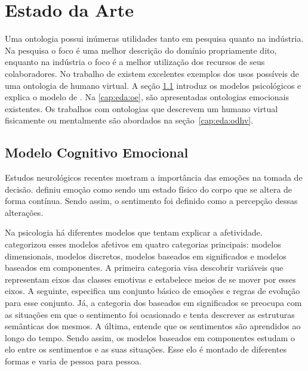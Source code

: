 \chapter{Estado da Arte} \label{cap:eda}

Uma ontologia possui inúmeras utilidades tanto em pesquisa quanto na
indústria. Na pesquisa o foco é uma melhor descrição do domínio propriamente
dito, enquanto na indústria o foco é a melhor utilização dos recursos de seus
colaboradores. No trabalho de \citet{Gutierrez:2007:OVH:1229160.1229164} existem
excelentes exemplos dos usos possíveis de uma ontologia de humano virtual.
A seção \ref{cap:eda:mce} introduz os modelos psicológicos e explica o modelo de
\citet{ortony1988cse}. Na \ref{cap:eda:oe}, são apresentadas ontologias emocionais
existentes. Os trabalhos com ontologias que descrevem um humano virtual
fisicamente ou mentalmente são abordados na seção~\ref{cap:eda:odhv}.

\section{Modelo Cognitivo Emocional} \label{cap:eda:mce}

Estudos neurológicos recentes \cite{ledoux1998emotional,damasio2004erro}
mostram a importância das emoções na tomada de decisão.
\citet{damasio2004erro} definiu emoção como sendo um estado físico do corpo
que se altera de forma contínua. Sendo assim, o sentimento foi definido como a
percepção dessas alterações.

Na psicologia há diferentes modelos que tentam explicar a afetividade.
\citet{scherer2000tnoe} categorizou esses modelos afetivos em quatro
categorias principais: modelos dimensionais, modelos discretos, modelos
baseados em significados e modelos baseados em componentes. A primeira
categoria visa descobrir variáveis que representam eixos das classes emotivas
e estabelece meios de se mover por esses eixos. A seguinte, especifica um
conjunto básico de emoções e regras de evolução para esse conjunto.
Já, a categoria dos baseados em significados se preocupa com as situações
em que o sentimento foi ocasionado e tenta descrever as estruturas semânticas dos
mesmos. A última, entende que os sentimentos são aprendidos ao longo do tempo.
Sendo assim, os modelos baseados em componentes estudam o elo entre os
sentimentos e as suas situações. Esse elo é montado de diferentes formas e
varia de pessoa para pessoa.

